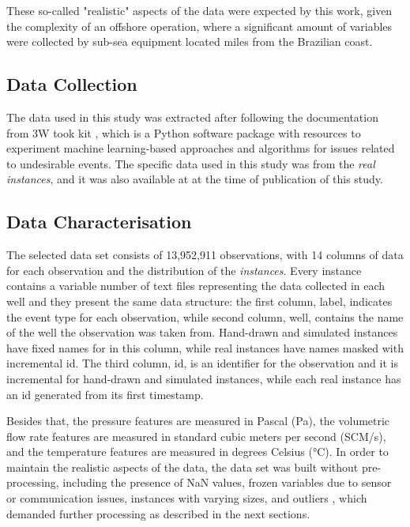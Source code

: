 \documentclass{article}
\begin{document}
These so-called "realistic" aspects of the data were expected by this work, given the complexity of an offshore operation, where a significant amount of variables were collected by sub-sea equipment located miles from the Brazilian coast.

\subsection{Data Collection}
The data used in this study was extracted after following the documentation from 3W took kit \parencite{petrobras3WToolkit}, which is a Python software package with resources to experiment machine learning-based approaches and algorithms for issues related to undesirable events. The specific data used in this study was from the \emph{real instances}, and it was also available at \textcite{extracted3Wcsv} at the time of publication of this study.

\subsection{Data Characterisation}

The selected data set consists of 13,952,911 observations, with 14 columns of data for each observation and the distribution of the \emph{instances}. Every instance contains a variable number of text files representing the data collected in each well and they present the same data structure: the first column, label, indicates the event type for each observation, while second column, well, contains the name of the well the observation was taken from. Hand-drawn and simulated instances have fixed names for in this column, while real instances have names masked with incremental id. The third column, id, is an identifier for the observation and it is incremental for hand-drawn and simulated instances, while each real instance has an id generated from its first timestamp. 

Besides that, the pressure features are measured in Pascal (Pa), the volumetric flow rate features are measured in standard cubic meters per second (SCM/s), and the temperature features are measured in degrees Celsius (°C). In order to maintain the realistic aspects of the data, the data set was built without pre-processing, including the presence of NaN values, frozen variables due to sensor or communication issues, instances with varying sizes, and outliers \parencite{revvargas2019}, which demanded further processing as described in the next sections.
\end{document}
